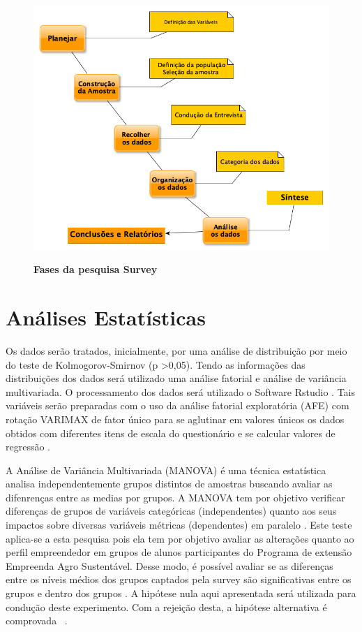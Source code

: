 \begin{figure}[!htb]
\centering
\caption{\textbf{Fases da pesquisa Survey}}
\includegraphics[scale=0.5]{Imagens/diagrama_survey.png}
\label{figura_1}
\end{figure}

\clearpage


\section{Análises Estatísticas}


Os dados serão tratados, inicialmente, por uma análise de distribuição por meio do teste de
Kolmogorov-Smirnov (p >0,05). Tendo as informações das distribuições dos dados será utilizado uma análise fatorial e análise de variância multivariada. O processamento dos dados será utilizado o Software Rstudio \cite{rstudio_team_rstudio:_2015}.  Tais variáveis serão preparadas com o uso da análise fatorial exploratória (AFE) com rotação VARIMAX de fator único para se aglutinar em valores únicos os dados obtidos com diferentes itens de escala do questionário e se calcular valores de regressão \cite{hair_multivariate_2006}.


A Análise de Variância Multivariada (MANOVA) é uma técnica estatística analisa independentemente grupos distintos de amostras buscando avaliar as difenrenças entre as medias por grupos.
A MANOVA tem por objetivo verificar diferenças de grupos de variáveis categóricas (independentes) quanto aos seus impactos sobre diversas variáveis métricas (dependentes) em paralelo  \cite{hair_alise_2009}. 
Este teste aplica-se a esta pesquisa pois ela tem por objetivo avaliar as alterações quanto ao perfil empreendedor em grupos de alunos participantes do Programa de extensão Empreenda Agro Sustentável. Desse modo, é possível avaliar se as diferenças entre os níveis médios dos grupos captados pela \textit{}{survey} são significativas entre os grupos e dentro dos grupos \cite{rocha_avaliacao_2014}. A hipótese nula aqui apresentada será utilizada para condução deste experimento. Com a rejeição desta, a hipótese alternativa é comprovada \ \cite{hair_alise_2009}.

